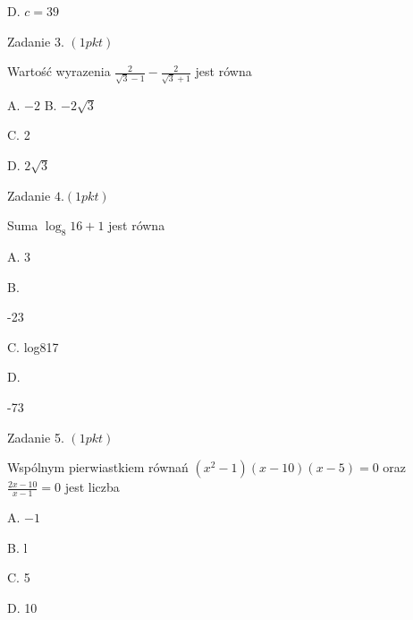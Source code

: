 \documentclass[a4paper,12pt]{article}
\begin{document}
D. $c=39$

Zadanie 3. $(1pkt)$

Wartość wyrazenia $\displaystyle \frac{2}{\sqrt{3}-1}-\frac{2}{\sqrt{3}+1}$ jest równa

A. $-2$ B. $-2\sqrt{3}$

C. 2

D. $2\sqrt{3}$

Zadanie $4.(1pkt)$

Suma $\log_{8}16+1$ jest równa

A. 3

B.

-23

C. log817

D.

-73

Zadanie 5. $(1pkt)$

Wspólnym pierwiastkiem równań $(x^{2}-1)(x-10)(x-5)=0$ oraz $\displaystyle \frac{2x-10}{x-1}=0$ jest liczba

A. $-1$

B. l

C. 5

D. 10
\end{document}
